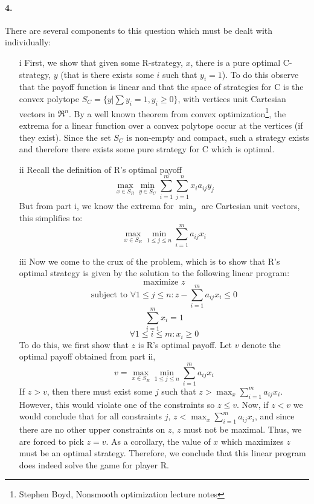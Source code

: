 \documentclass{article}
\begin{document}
\paragraph{4.} There are several components to this question which must be dealt with individually:
\begin{itemize}
\item[i] First, we show that given some R-strategy, $x$, there is a pure optimal C-strategy, $y$ (that is there exists some $i$ such that $y_i = 1$).  To do this observe that the payoff function is linear and that the space of strategies for C is the convex polytope $S_C = \{ y | \sum y_i = 1, y_i \geq 0 \}$, with vertices unit Cartesian vectors in $\Re^n$.  By a well known theorem from convex optimization\footnote{Stephen Boyd, Nonsmooth optimization lecture notes}, the extrema for a linear function over a convex polytope occur at the vertices (if they exist).  Since the set $S_C$ is non-empty and compact, such a strategy exists and therefore there exists some pure strategy for C which is optimal.
\item[ii] Recall the definition of R's optimal payoff
\[ \max_{x \in S_R} \min_{y \in S_C} \sum \limits_{i=1}^m \sum \limits_{j=1}^n x_i a_{ij} y_j \]
But from part i, we know the extrema for $\min_y$ are Cartesian unit vectors, this simplifies to:
\[ \max_{x \in S_R} \min_{1 \leq j \leq n} \sum \limits_{i=1}^m a_{ij} x_i \]
\item[iii] Now we come to the crux of the problem, which is to show that R's optimal strategy is given by the solution to the following linear program:
\[ \textrm{maximize } z \]
\[ \textrm{subject to } \forall 1 \leq j \leq n : z - \sum \limits_{i=1}^m a_{ij} x_i \leq 0 \]
\[ \sum \limits_{i=1}^m x_i = 1 \]
\[ \forall 1 \leq i \leq m : x_i \geq 0 \]
To do this, we first show that $z$ is R's optimal payoff.  Let $v$ denote the optimal payoff obtained from part ii,
\[ v = \max_{x \in S_R} \min_{1 \leq j \leq n} \sum \limits_{i=1}^m a_{ij} x_i \]
If $z > v$, then there must exist some $j$ such that $z > \max_x \sum \limits_{i=1}^m a_{ij} x_i$.  However, this would violate one of the constraints so $z \leq v$.  Now, if $z < v$ we would conclude that for all constraints $j$, $z < \max_x \sum \limits_{i=1}^m a_{ij} x_i$, and since there are no other upper constraints on $z$, $z$ must not be maximal.  Thus, we are forced to pick $z = v$.  As a corollary, the value of $x$ which maximizes $z$ must be an optimal strategy.  Therefore, we conclude that this linear program does indeed solve the game for player R.


\end{itemize}
\end{document}
